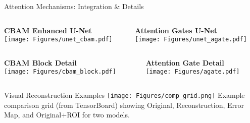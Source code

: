 \documentclass{beamer}
\begin{document}
\begin{frame}{Attention Mechanisms: Integration \& Details}
  \centering
  \begin{columns}[T,totalwidth=\textwidth] %
    \begin{column}{0.48\textwidth}
      {\footnotesize \textbf{CBAM Enhanced U-Net}} \\
      \texttt{[image: Figures/unet\_cbam.pdf]}
    \end{column}
    \hfill %
    \begin{column}{0.48\textwidth}
      {\footnotesize \textbf{Attention Gates U-Net}} \\
      \texttt{[image: Figures/unet\_agate.pdf]}
    \end{column}
  \end{columns}
  
  \vspace{2mm} %

  \begin{columns}[T,totalwidth=\textwidth]
    \begin{column}{0.48\textwidth}
      {\footnotesize \textbf{CBAM Block Detail}} \\
      \texttt{[image: Figures/cbam\_block.pdf]}
    \end{column}
    \hfill
    \begin{column}{0.48\textwidth}
      {\footnotesize \textbf{Attention Gate Detail}} \\
      \texttt{[image: Figures/agate.pdf]}
    \end{column}
  \end{columns}
\end{frame}

\begin{frame}{Visual Reconstruction Examples}
  \centering
  \texttt{[image: Figures/comp\_grid.png]}
  \vspace{1mm}
  \tiny Example comparison grid (from TensorBoard) showing Original, Reconstruction, Error Map, and Original+ROI for two models.
\end{frame}
\end{document}

